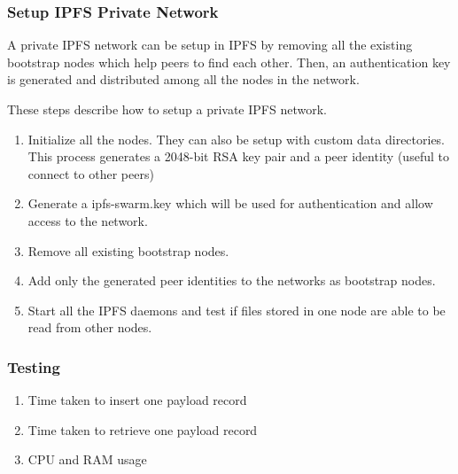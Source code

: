 \documentclass[11pt,openright]{report}
\begin{document}
\subsubsection{Setup IPFS Private Network}
A private IPFS network can be setup in IPFS by removing all the existing bootstrap nodes which help peers to find each other. Then, an authentication key is generated and distributed among all the nodes in the network.

These steps describe how to setup a private IPFS network.
\begin{enumerate}
    \item Initialize all the nodes. They can also be setup with custom data directories. This process generates a 2048-bit RSA key pair and a peer identity (useful to connect to other peers)
    \item Generate a ipfs-swarm.key which will be used for authentication and allow access to the network.
    \item Remove all existing bootstrap nodes.
    \item Add only the generated peer identities to the networks as bootstrap nodes.
    \item Start all the IPFS daemons and test if files stored in one node are able to be read from other nodes.
\end{enumerate}

\subsubsection{Testing}
\begin{enumerate}
    \item Time taken to insert one payload record
    \item Time taken to retrieve one payload record
    \item CPU and RAM usage
\end{enumerate}

\end{document}
